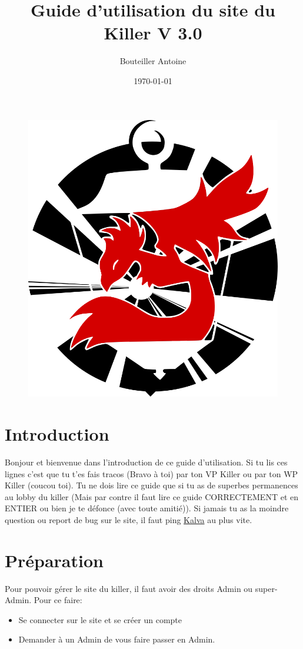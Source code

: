 \documentclass[12pt]{article}
\title{Guide d'utilisation du site du Killer V 3.0}
\author{Bouteiller Antoine}
\date{\today}
\begin{document}
\maketitle


\begin{figure}[!ht]
  \centering
  \includegraphics[width=0.7\linewidth]{img/red}
\end{figure} 

\newpage
\tableofcontents
\section{Introduction}
Bonjour et bienvenue dans l'introduction de ce guide d'utilisation. Si tu lis ces lignes c'est que tu t'es fais tracos (Bravo à toi) par ton VP Killer ou par ton WP Killer (coucou toi). Tu ne dois lire ce guide que si tu as de superbes permanences au lobby du killer (Mais par contre il faut lire ce guide CORRECTEMENT et en ENTIER ou bien je te défonce (avec toute amitié)). Si jamais tu as la moindre question ou report de bug sur le site, il faut ping \href{https://t.me/Kalva_Grost0ny}{Kalva} au plus vite.

\section{Préparation}
Pour pouvoir gérer le site du killer, il faut avoir des droits Admin ou super-Admin. Pour ce faire:
\begin{itemize}
  \item Se connecter sur le site et se créer un compte
  \item Demander à un Admin de vous faire passer en Admin.
\end{itemize}
\end{document}
